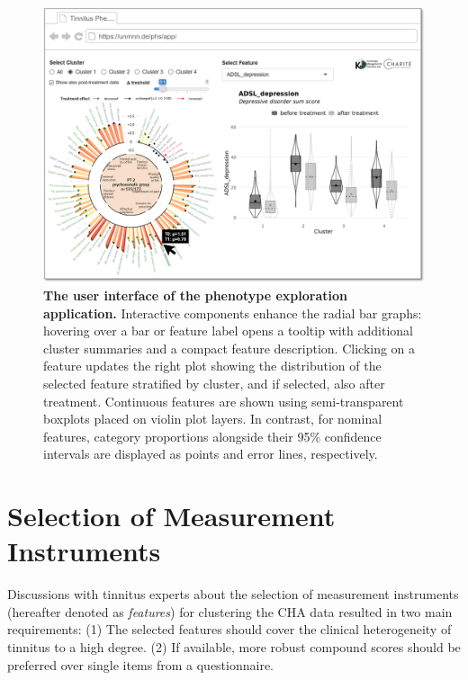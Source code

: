 \documentclass[
  oneside]{book}
\begin{document}
\begin{figure}[htb]

{\centering \includegraphics[width=1\linewidth]{figures/05-gui-pheno} 

}

\caption{\textbf{The user interface of the phenotype exploration application.} Interactive components enhance the radial bar graphs: hovering over a bar or feature label opens a tooltip with additional cluster summaries and a compact feature description. Clicking on a feature updates the right plot showing the distribution of the selected feature stratified by cluster, and if selected, also after treatment. Continuous features are shown using semi-transparent boxplots placed on violin plot \autocite{Hintze:Violin1998} layers. In contrast, for nominal features, category proportions alongside their 95\% confidence intervals are displayed as points and error lines, respectively.}\label{fig:05-gui-pheno}
\end{figure}

\hypertarget{phenotypes-features}{%
\section{Selection of Measurement Instruments}\label{phenotypes-features}}

Discussions with tinnitus experts about the selection of measurement instruments (hereafter denoted as \emph{features}) for clustering the CHA data resulted in two main requirements:
(1) The selected features should cover the clinical heterogeneity of tinnitus to a high degree.
(2) If available, more robust compound scores should be preferred over single items from a questionnaire.
\end{document}
